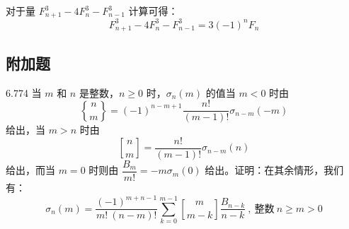 对于量 \( F_{n+1}^3 - 4 F_n^3 - F_{n-1}^3 \) 计算可得：
\[
  F_{n+1}^3 - 4F_n^3 - F_{n-1}^3 = 3 (-1)^n F_n
\]

\subsection{附加题}

\begin{problem}{6.77}{4}
  当 \( m \) 和 \( n \) 是整数，\( n \geqslant 0 \) 时，\( \sigma_n(m) \) 的值当 \( m < 0 \) 时由
  \[
    \genfrac{\{}{\}}{0pt}{} {n}{m} = (-1)^{n-m+1} \frac{n!}{(m-1)!} \sigma_{n-m}(-m)
  \]
  给出，当 \( m>n \) 时由
  \[
    \genfrac{[}{]}{0pt}{} {n}{m} = \frac{n!}{(m-1)!} \sigma_{n-m}(n)
  \]
  给出，而当 \( m=0 \) 时则由 \( \dfrac{B_m}{m!} = -m \sigma_{m}(0) \) 给出。证明：在其余情形，我们有：
  \[
    \sigma_n (m) = \dfrac{(-1)^{m+n-1}}{m! \ (n-m)!} \sum_{k=0}^{m-1} \genfrac{[}{]}{0pt}{} {m}{m-k} \dfrac{B_{n-k}}{n-k} \ , \ \text{整数} \ n \geqslant m > 0
  \]
\end{problem}

